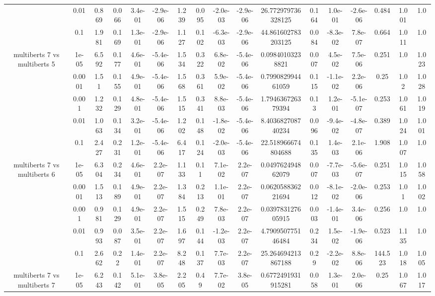 \begin{tabular}{|c|c|c|c|c|c|c|c|c|c|c|c|c|c|c|c|c|}
 & 0.01 & 0.869 & 0.066 & 3.4e-01 & -2.9e-06 & 1.239 & 0.095 & -2.0e-03 & -2.9e-06 & 26.772979736328125 & 0.164 & 1.0e-01 & -2.6e-06 & 0.484 & 1.001 & 1.0 \\
 & 0.1 & 1.981 & 0.169 & 1.3e-01 & -2.9e-06 & 1.127 & 0.102 & -6.3e-03 & -2.9e-06 & 44.861602783203125 & 0.084 & -8.3e-02 & 7.8e-07 & 0.664 & 1.011 & 1.0 \\
\hline
\multirow{5}{*}{multiberts 7 vs multiberts 5} & 1e-05 & 6.592 & 0.177 & 4.6e-01 & -5.4e-06 & 1.534 & 0.322 & 6.8e-02 & -5.4e-06 & 0.09840103238821 & 0.007 & 4.5e-02 & 7.5e-06 & 0.251 & 1.0 & 1.023 \\
 & 0.0001 & 1.51 & 0.155 & 4.9e-01 & -5.4e-06 & 1.568 & 0.361 & 5.9e-02 & -5.4e-06 & 0.799082994461059 & 0.115 & -1.1e-02 & 2.2e-06 & 0.25 & 1.02 & 1.028 \\
 & 0.001 & 1.232 & 0.129 & 4.8e-01 & -5.4e-06 & 1.515 & 0.341 & 8.8e-03 & -5.4e-06 & 1.794636726379394 & 0.13 & 1.2e-01 & -5.1e-07 & 0.253 & 1.061 & 1.019 \\
 & 0.01 & 1.063 & 0.134 & 3.2e-01 & -5.4e-06 & 1.202 & 0.148 & -1.8e-02 & -5.4e-06 & 8.403682708740234 & 0.096 & -9.4e-02 & -4.8e-07 & 0.389 & 1.024 & 1.001 \\
 & 0.1 & 2.427 & 0.231 & 1.2e-01 & -5.4e-06 & 6.417 & 0.124 & -2.0e-03 & -5.4e-06 & 22.518966674804688 & 0.135 & 1.4e-03 & 2.1e-06 & 1.908 & 1.007 & 1.0 \\
\hline
\multirow{5}{*}{multiberts 7 vs multiberts 6} & 1e-05 & 6.304 & 0.234 & 4.6e-01 & 2.2e-07 & 1.133 & 0.11 & 7.1e-02 & 2.2e-07 & 0.049762494862079 & 0.007 & -7.7e-03 & -5.6e-07 & 0.251 & 1.015 & 1.058 \\
 & 0.0001 & 1.513 & 0.189 & 4.9e-01 & 2.2e-07 & 1.384 & 0.213 & 1.1e-01 & 2.2e-07 & 0.062058836221694 & 0.012 & -8.1e-02 & -2.0e-06 & 0.253 & 1.01 & 1.002 \\
 & 0.001 & 0.981 & 0.129 & 4.9e-01 & 2.2e-07 & 1.515 & 0.249 & 7.8e-03 & 2.2e-07 & 0.039783127605915 & 0.003 & -1.4e-01 & 3.4e-06 & 0.256 & 1.0 & 1.0 \\
 & 0.01 & 0.993 & 0.087 & 3.5e-01 & 2.2e-07 & 1.697 & 0.144 & -1.2e-03 & 2.2e-07 & 4.790950775146484 & 0.234 & 1.5e-02 & -1.9e-06 & 0.523 & 1.135 & 1.0 \\
 & 0.1 & 2.662 & 0.22 & 1.4e-01 & 2.2e-07 & 8.248 & 0.137 & 7.7e-03 & 2.2e-07 & 25.264694213867188 & 0.29 & -2.2e-02 & 8.8e-06 & 144.523 & 1.018 & 1.005 \\
\hline
\multirow{5}{*}{multiberts 7 vs multiberts 7} & 1e-05 & 6.243 & 0.142 & 5.1e-01 & 3.8e-05 & 2.205 & 0.49 & 7.7e-02 & 3.8e-05 & 0.6772491931915281 & 0.058 & 1.3e-01 & 2.0e-06 & 0.25 & 1.067 & 1.017 \\

\end{tabular}
